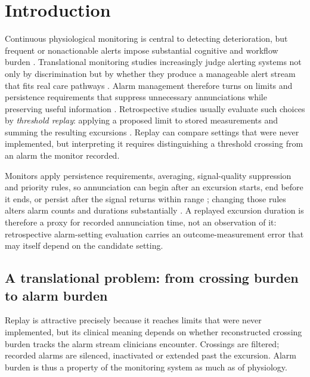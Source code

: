 \documentclass[11pt,letterpaper]{article}
\begin{document}
\section{Introduction}\label{sec:intro}
Continuous physiological monitoring is central to detecting deterioration, but frequent or nonactionable alerts impose substantial cognitive and workflow burden \citep{chambrin1999multicentric,drew2014insights,cvach2012monitor,bonafide2015association,bonafide2017video,rasooly2021burden,hyland2020circulatory}. Translational monitoring studies increasingly judge alerting systems not only by discrimination but by whether they produce a manageable alert stream that fits real care pathways \citep{henry2015trewscore,hyland2020circulatory,lin2024ecg,rossetti2025concern}. Alarm management therefore turns on limits and persistence requirements that suppress unnecessary annunciations while preserving useful information \citep{ruskin2015alarmfatigue,hravnak2018call,paine2016systematic,winters2018technological}. Retrospective studies usually evaluate such choices by \emph{threshold replay}: applying a proposed limit to stored measurements and summing the resulting excursions \citep{welch2016multiparameter,poole2018personalized,vanrossum2022adaptive}. Replay can compare settings that were never implemented, but interpreting it requires distinguishing a threshold crossing from an alarm the monitor recorded.

Monitors apply persistence requirements, averaging, signal-quality suppression and priority rules, so annunciation can begin after an excursion starts, end before it ends, or persist after the signal returns within range \citep{iec2020alarms,aami2002ec13,imhoff2006algorithms}; changing those rules alters alarm counts and durations substantially \citep{rheineck1998influence,vagedes2014conversion,mcclure2016alarms,gorges2009delays,schmid2017adaptive}. A replayed excursion duration is therefore a proxy for recorded annunciation time, not an observation of it: retrospective alarm-setting evaluation carries an outcome-measurement error that may itself depend on the candidate setting.

\subsection{A translational problem: from crossing burden to alarm burden}

Replay is attractive precisely because it reaches limits that were never implemented, but its clinical meaning depends on whether reconstructed crossing burden tracks the alarm stream clinicians encounter. Crossings are filtered; recorded alarms are silenced, inactivated or extended past the excursion. Alarm burden is thus a property of the monitoring system as much as of physiology.
\end{document}
